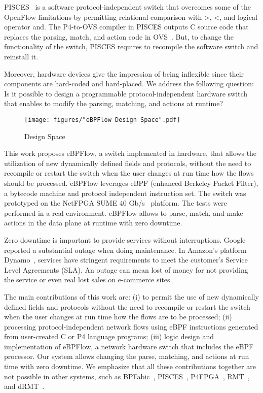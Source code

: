 PISCES~\cite{Shahbaz:2016:Pisces} is a software protocol-independent switch that overcomes some of the OpenFlow limitations by permitting relational comparison with >, <, and logical operator and. The P4-to-OVS compiler in PISCES outputs C source code that replaces
the parsing, match, and action code in OVS~\cite{Pfaff:2015:OpenVSwitch}. But, to change the functionality of the switch, PISCES requires to recompile the software switch and reinstall it.

Moreover, hardware devices give the impression of being inflexible since their components are hard-coded and hard-placed. We address the following question: Is it possible to design a programmable protocol-independent hardware switch that enables to modify the parsing, matching, and actions at runtime? 

 \begin{figure}[!htp]
 \centering
\texttt{[image: figures/"eBPFlow Design Space".pdf]}
 \caption{Design Space}
 \label{fig:Comparison}
 \end{figure}




This work proposes eBPFlow, a switch implemented in hardware, that allows the utilization of new dynamically defined fields and protocols, without the need to recompile or restart the switch when the user changes at run time how the flows should be processed. 
eBPFlow leverages eBPF (enhanced Berkeley Packet Filter), a bytecode machine and protocol independent instruction set. %
The switch was prototyped on the NetFPGA SUME 40 Gb/s~\cite{SUME2014} platform. The tests were performed in a real environment. eBPFlow allows to parse, match, and make actions in the data plane at runtime with zero downtime.

Zero downtime is important to provide services without interruptions.
Google~\cite{Jain:2013:BEG:2486001.2486019} reported a substantial outage when doing maintenance. In  Amazon's platform Dynamo~\cite{DeCandia:2007:DAH:1294261.1294281},  services have stringent requirements to meet the customer's Service Level Agreements (SLA).
An outage can mean lost of money for not providing the service or even real lost sales on e-commerce sites.



The main contributions of this work are: (i) to permit the use of new dynamically defined fields and protocols without the need to recompile or restart the switch when the user changes at run time how the flows are to be processed; (ii) processing protocol-independent network flows using eBPF instructions generated from user-created C or P4 language programs; (iii) logic design and implementation of eBPFlow, a network hardware switch that includes the eBPF processor. Our system allows changing the parse, matching, and actions at run time with zero downtime. We emphasize that all these contributions together are not possible in other systems, such as BPFabic~\cite{Jouet:2017:BPFabric}, PISCES~\cite{Shahbaz:2016:Pisces}, P4FPGA~\cite{p4fpga}, RMT~\cite{bosshart2013forwarding}, and dRMT~\cite{chole2017drmt}. 

